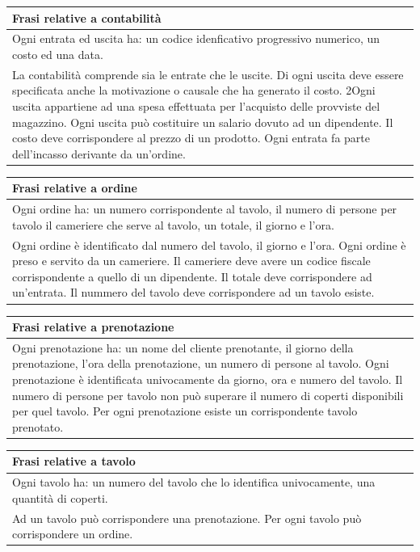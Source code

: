 \begin{longtable}{|p{15.5cm}|}
    \hline
    \textbf{Frasi relative a contabilità} \\ \hline
    Ogni entrata ed uscita ha: un codice idenficativo progressivo numerico, un costo ed una data.\\
    La contabilità comprende sia le entrate che le uscite.
    Di ogni uscita deve essere specificata anche la motivazione o causale che ha generato
    il costo.
    2Ogni uscita appartiene ad una spesa effettuata per l’acquisto delle provviste del magazzino.
    Ogni uscita può costituire un salario dovuto ad un dipendente.
    Il costo deve corrispondere al prezzo di un prodotto.
    Ogni entrata fa parte dell’incasso derivante da un’ordine.
    \\ \hline
\end{longtable}

\begin{longtable}{|p{15.5cm}|}
    \hline
    \textbf{Frasi relative a ordine} \\ \hline
    Ogni ordine ha: un numero corrispondente al tavolo, il numero di persone per tavolo il cameriere che serve al tavolo, un totale, il giorno e l'ora. \\
    Ogni ordine è identificato dal numero del tavolo, il giorno e l’ora.
    Ogni ordine è preso e servito da un cameriere.
    Il cameriere deve avere un codice fiscale corrispondente a quello di un dipendente.
    Il totale deve corrispondere ad un’entrata.
    Il nummero del tavolo deve corrispondere ad un tavolo esiste.
    \\ \hline
\end{longtable}

\begin{longtable}{|p{15.5cm}|}
    \hline
    \textbf{Frasi relative a prenotazione} \\ \hline
    Ogni prenotazione ha: un nome del cliente prenotante, il giorno della prenotazione, l'ora della prenotazione, un numero di persone al tavolo. 
    Ogni prenotazione è identificata univocamente da giorno, ora e numero del tavolo.
    Il numero di persone per tavolo non può superare il numero di coperti disponibili per
    quel tavolo.
    Per ogni prenotazione esiste un corrispondente tavolo prenotato.
    \\ \hline
\end{longtable}

\begin{longtable}{|p{15.5cm}|}
    \hline
    \textbf{Frasi relative a tavolo} \\ \hline
    Ogni tavolo ha: un numero del tavolo che lo identifica univocamente, una quantità di coperti. \\
    Ad un tavolo può corrispondere una prenotazione. 
    Per ogni tavolo può corrispondere un ordine.
    \\ \hline
\end{longtable}

